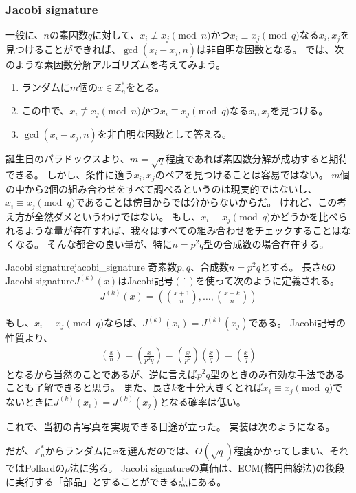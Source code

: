 \subsubsection{Jacobi signature}
一般に、$n$の素因数$q$に対して、$x_i \not\equiv x_j \pmod{n}$かつ$x_i \equiv x_j \pmod{q}$なる$x_i,x_j$を見つけることができれば、$\gcd(x_i-x_j, n)$は非自明な因数となる。
では、次のような素因数分解アルゴリズムを考えてみよう。

\begin{enumerate}
 \item ランダムに$m$個の$x\in\mathbb{Z}_n^*$をとる。
 \item この中で、$x_i \not\equiv x_j \pmod{n}$かつ$x_i \equiv x_j \pmod{q}$なる$x_i,x_j$を見つける。
 \item $\gcd(x_i-x_j, n)$を非自明な因数として答える。
\end{enumerate}

誕生日のパラドックスより、$m=\sqrt{q}$程度であれば素因数分解が成功すると期待できる。
しかし、条件に適う$x_i,x_j$のペアを見つけることは容易ではない。
$m$個の中から2個の組み合わせをすべて調べるというのは現実的ではないし、$x_i \equiv x_j \pmod{q}$であることは傍目からでは分からないからだ。
けれど、この考え方が全然ダメというわけではない。
もし、$x_i \equiv x_j \pmod{q}$かどうかを比べられるような量が存在すれば、我々はすべての組み合わせをチェックすることはなくなる。
そんな都合の良い量が、特に$n=p^2q$型の合成数の場合存在する。

\begin{Defi}{Jacobi signature\cite{PeraltaOkamoto1996}}{jacobi_signature}
奇素数$p,q$、合成数$n=p^2q$とする。
長さ$k$のJacobi signature$J^{(k)}(x)$はJacobi記号$\left(\frac{\cdot}{\cdot} \right)$を使って次のように定義される。
\begin{align*}
J^{(k)}(x) = \left( \left(\frac{x + 1}{n} \right), \ldots, \left(\frac{x + k}{n} \right) \right)
\end{align*}
\end{Defi}

もし、$x_i \equiv x_j \pmod{q}$ならば、$J^{(k)}(x_i)=J^{(k)}(x_j)$である。
Jacobi記号の性質より、
\begin{align*}
\left(\frac{x}{n} \right) = \left(\frac{x}{p^2q} \right) = \left(\frac{x}{p^2} \right)\left(\frac{x}{q} \right) = \left(\frac{x}{q} \right)
\end{align*}
となるから当然のことであるが、逆に言えば$p^2q$型のときのみ有効な手法であることも了解できると思う。
また、長さ$k$を十分大きくとれば$x_i \equiv x_j \pmod{q}$でないときに$J^{(k)}(x_i)=J^{(k)}(x_j)$となる確率は低い。

これで、当初の青写真を実現できる目途が立った。
実装は次のようになる。


だが、$\mathbb{Z}_n^*$からランダムに$x$を選んだのでは、$O(\sqrt{q})$程度かかってしまい、それではPollardの$\rho$法に劣る。
Jacobi signatureの真価は、ECM(楕円曲線法)の後段に実行する「部品」とすることができる点にある。

